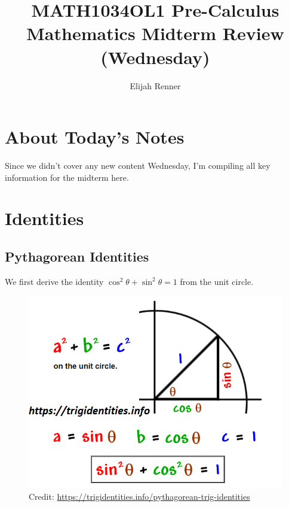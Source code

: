 \documentclass[12pt]{article}
\title{MATH1034OL1 Pre-Calculus Mathematics Midterm Review (Wednesday)}
\author{Elijah Renner}
\begin{document}
\maketitle

\vspace{0.5in}

\tableofcontents

\section{About Today's Notes}

Since we didn't cover any new content Wednesday, I'm compiling all key information for the midterm here.

\section{Identities}

\subsection{Pythagorean Identities}

We first derive the identity \(\cos^2\theta + \sin^2\theta = 1\) from the unit circle.\\

\begin{figure}[H]
	\centering
	\includegraphics[scale=0.4]{Pythagorean Identity.png}
	\caption{Credit: \url{https://trigidentities.info/pythagorean-trig-identities}}
\end{figure}
\end{document}
